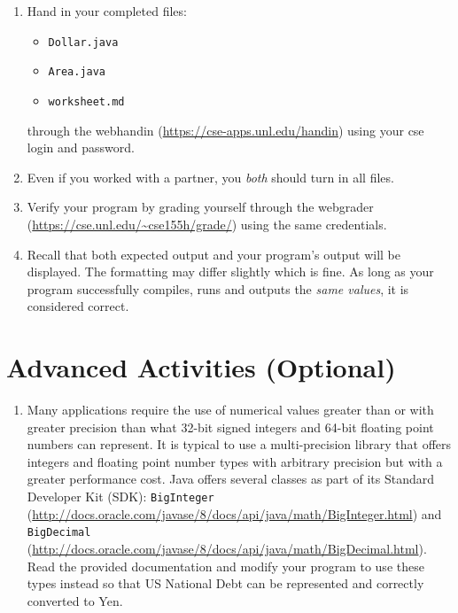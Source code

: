 \documentclass[12pt]{scrartcl}
\begin{document}
\begin{enumerate}
  \item Hand in your completed files:
    \begin{itemize}
    \item \texttt{Dollar.java}
    \item \texttt{Area.java}
    \item \texttt{worksheet.md}
  \end{itemize}
  through the webhandin (\url{https://cse-apps.unl.edu/handin}) 
  using your cse login and password.  
  \item Even if you worked with a partner, you \emph{both} should
  turn in all files.
  \item Verify your program by grading yourself through the
  webgrader (\url{https://cse.unl.edu/~cse155h/grade/}) using the
  same credentials.
  \item Recall that both expected output and your program's output
  will be displayed.  The formatting may differ slightly which is fine.
  As long as your program successfully compiles, runs and outputs 
  the \emph{same values}, it is considered correct.
\end{enumerate}


\section{Advanced Activities (Optional)}

\begin{enumerate}
%

  \item Many applications require the use of numerical values greater than or with 
  	greater precision than what 32-bit signed integers and 64-bit floating point 
	numbers can represent.  It is typical to use a multi-precision library that offers 
	integers and floating point number types with arbitrary precision but with a 
	greater performance cost.  Java offers several classes as part of its Standard 
	Developer Kit (SDK): \texttt{BigInteger} (\url{http://docs.oracle.com/javase/8/docs/api/java/math/BigInteger.html}) 	and \texttt{BigDecimal} (\url{http://docs.oracle.com/javase/8/docs/api/java/math/BigDecimal.html}).  
	Read the provided documentation and modify your program to use these 
	types instead so that US National Debt can be represented and correctly 
	converted to Yen. 
\end{enumerate}
\end{document}
